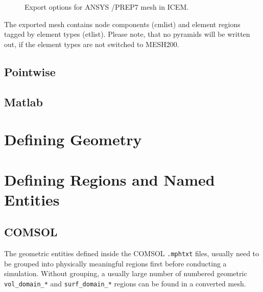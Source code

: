 \begin{figure}[htb] 
  \centering 
  \qquad
  \caption{Export options for ANSYS /PREP7 mesh in ICEM.}
  \label{fig:icem_export_ansys_opts}
\end{figure}

The exported mesh contains node components (cmlist) and element regions tagged
by element types (etlist). Please note,  that no pyramids will be written out,
if the element types are not switched to MESH200.

\subsection{Pointwise}
\subsection{Matlab}

\section{Defining Geometry}

\section{Defining Regions and Named Entities}

\subsection{COMSOL}
\label{sec:preproc_comsol_region_map}

The geometric entities defined inside the COMSOL {\tt .mphtxt} files, usually need to
be grouped into physically meaningful regions first before conducting a simulation.
Without grouping, a usually large number of numbered geometric {\tt vol\_domain\_*} and
{\tt surf\_domain\_*} regions can be found in a converted mesh.

